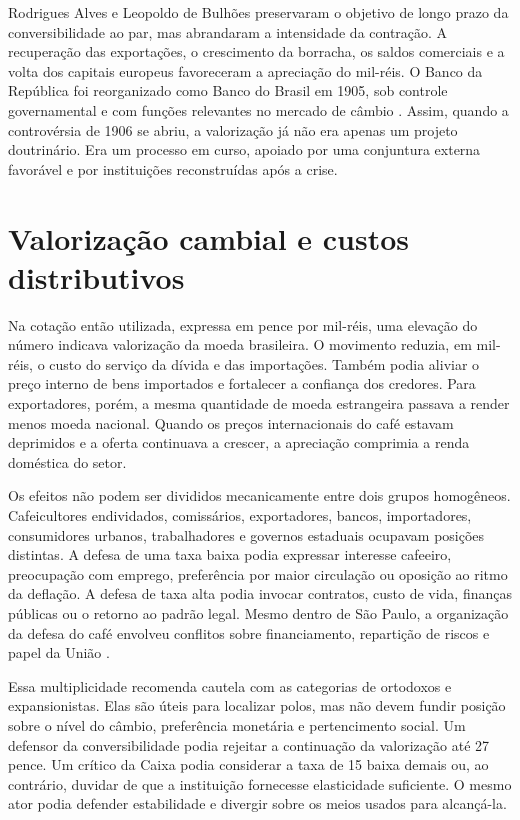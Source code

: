 Rodrigues Alves e Leopoldo de Bulhões preservaram o objetivo de longo prazo da conversibilidade ao par, mas abrandaram a intensidade da contração. A recuperação das exportações, o crescimento da borracha, os saldos comerciais e a volta dos capitais europeus favoreceram a apreciação do mil-réis. O Banco da República foi reorganizado como Banco do Brasil em 1905, sob controle governamental e com funções relevantes no mercado de câmbio \cite{fritsch1980,oliveirasilva2001}. Assim, quando a controvérsia de 1906 se abriu, a valorização já não era apenas um projeto doutrinário. Era um processo em curso, apoiado por uma conjuntura externa favorável e por instituições reconstruídas após a crise.

\section{Valorização cambial e custos distributivos}

Na cotação então utilizada, expressa em pence por mil-réis, uma elevação do número indicava valorização da moeda brasileira. O movimento reduzia, em mil-réis, o custo do serviço da dívida e das importações. Também podia aliviar o preço interno de bens importados e fortalecer a confiança dos credores. Para exportadores, porém, a mesma quantidade de moeda estrangeira passava a render menos moeda nacional. Quando os preços internacionais do café estavam deprimidos e a oferta continuava a crescer, a apreciação comprimia a renda doméstica do setor.

Os efeitos não podem ser divididos mecanicamente entre dois grupos homogêneos. Cafeicultores endividados, comissários, exportadores, bancos, importadores, consumidores urbanos, trabalhadores e governos estaduais ocupavam posições distintas. A defesa de uma taxa baixa podia expressar interesse cafeeiro, preocupação com emprego, preferência por maior circulação ou oposição ao ritmo da deflação. A defesa de taxa alta podia invocar contratos, custo de vida, finanças públicas ou o retorno ao padrão legal. Mesmo dentro de São Paulo, a organização da defesa do café envolveu conflitos sobre financiamento, repartição de riscos e papel da União \cite{perissinotto1999,torelli2004}.

Essa multiplicidade recomenda cautela com as categorias de ortodoxos e expansionistas. Elas são úteis para localizar polos, mas não devem fundir posição sobre o nível do câmbio, preferência monetária e pertencimento social. Um defensor da conversibilidade podia rejeitar a continuação da valorização até 27 pence. Um crítico da Caixa podia considerar a taxa de 15 baixa demais ou, ao contrário, duvidar de que a instituição fornecesse elasticidade suficiente. O mesmo ator podia defender estabilidade e divergir sobre os meios usados para alcançá-la.


